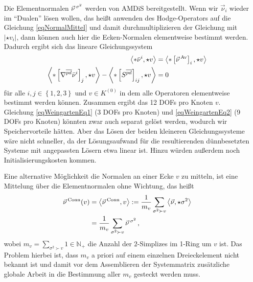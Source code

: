     Die Elementnormalen \( \vec{\nu}^{\,\sigma^{2}} \) werden von AMDiS bereitgestellt.
    Wenn wir \( \vec{\nu}_{i} \) wieder im "`Dualen"' lösen wollen, das heißt anwenden des Hodge-Operators auf die Gleichung
    \eqref{eqNormalMittel} und damit durchmultiplizieren der Gleichung mit \( \left| \star v_{i} \right| \), dann können auch hier die
    Ecken-Normalen elementweise bestimmt werden.
    Dadurch ergibt sich das lineare Gleichungssystem
    \begin{align}
        \label{eqWeingartenEq1}
        \left\langle *\bar{\nu}^{i} , \star v \right\rangle 
                &= \left\langle *\left[ \vec{\nu}^{\,\text{Av}} \right]_{i}, \star v \right\rangle \\
        \label{eqWeingartenEq2}
        \left\langle *\left[ \nabla^{\overline{pd}}\bar{\nu}^{i} \right]_{j} , \star v \right\rangle
            - \left\langle *\left[ S^{\overline{pd}} \right]_{ij} , \star v \right\rangle 
                &= 0
    \end{align}
    für alle \( i,j\in\left\{ 1,2,3 \right\} \) und \( v\in K^{(0)} \) in dem alle Operatoren elementweise bestimmt werden können.
    Zusammen ergibt das 12 DOFs pro Knoten \( v \).
    Gleichung \eqref{eqWeingartenEq1} (3 DOFs pro Knoten) und \eqref{eqWeingartenEq2} (9 DOFs pro Knoten) 
    könnten zwar auch separat gelöst werden, wodurch wir
    Speichervorteile hätten. 
    Aber das Lösen der beiden kleineren Gleichungssysteme wäre nicht schneller, 
    da der Lösungsaufwand für die
    resultierenden dünnbesetzten Systeme mit angepassten Lösern etwa linear ist.
    Hinzu würden außerdem noch Initialisierungskosten kommen.

    Eine alternative Möglichkeit die Normalen an einer Ecke \( v \) zu mitteln, ist eine Mittelung über die Elementnormalen ohne
    Wichtung, das heißt
    \begin{align}
      \label{eqNormalConnMittel}
      \begin{aligned}
      \vec{\nu}^{\,\text{Conn}}(v) &= \left\langle \vec{\nu}^{\,\text{Conn}}, v \right\rangle 
          := \frac{1}{m_{v}} \sum_{\sigma^{2}\succ v}
                      \left\langle \vec{\nu}, \star\sigma^{2} \right\rangle \\
          &= \frac{1}{m_{v}} \sum_{\sigma^{2}\succ v}
                                          \vec{\nu}^{\,\sigma^{2}} \,\text{,}
     \end{aligned}
    \end{align}
    wobei \( m_{v} = \sum_{\sigma^{2}\succ v} 1 \in \mathds{N}_{+}\) die Anzahl der \( 2 \)-Simplizes im 1-Ring um \( v \) ist.
    Das Problem hierbei ist, dass \( m_{v} \) a priori auf einem einzelnen Dreieckelement nicht bekannt ist und damit vor dem Assemblieren
    der Systemmatrix zusätzliche globale Arbeit in die Bestimmung aller \( m_{v} \) gesteckt werden muss.
    
